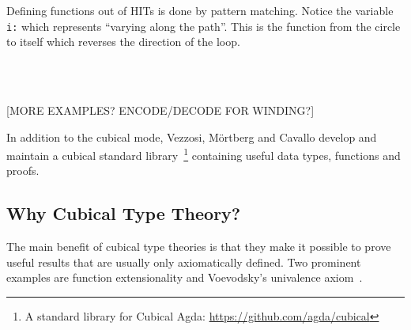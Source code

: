 Defining functions out of HITs is done by pattern matching. Notice the variable
\texttt{i:\I} which represents ``varying along the path''.
This is the function from the circle to itself which reverses the direction of the loop.

\begin{code}%
\>[0]\AgdaSpace{}%
\AgdaSymbol{:}\AgdaSpace{}%
\AgdaSpace{}%
\AgdaSpace{}%
\<%
\\
\>[0]\AgdaSpace{}%
\AgdaSpace{}%
\AgdaSymbol{=}\AgdaSpace{}%
\<%
\\
\>[0]\AgdaSpace{}%
\AgdaSymbol{(}\AgdaSpace{}%
\AgdaSymbol{)}\AgdaSpace{}%
\AgdaSymbol{=}\AgdaSpace{}%
\AgdaSpace{}%
\AgdaSymbol{(}\AgdaOperator{\AgdaPrimitive{\textasciitilde{}}}\AgdaSpace{}%
\AgdaSymbol{)}\<%
\end{code}

[MORE EXAMPLES? ENCODE/DECODE FOR WINDING?]

%
%


In addition to the cubical mode, Vezzosi, M\"ortberg and Cavallo develop and
maintain a cubical standard library~\footnote[1]{A standard library for Cubical
  Agda: \url{https://github.com/agda/cubical}} containing useful data types,
functions and proofs.
\subsection{Why Cubical Type Theory?}

The main benefit of cubical type theories is that they make it possible to prove
useful results that are usually only axiomatically defined. Two
prominent examples are function extensionality and Voevodsky's univalence
axiom~\cite{voevodsky2014}.

